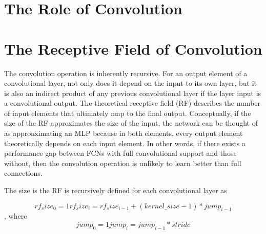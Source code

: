 

\section{The Role of Convolution}

\section{The Receptive Field of Convolution}
The convolution operation is inherently recursive. For an output element of a convolutional layer, not only does it depend on the input to its own layer, but it is also an indirect product of any previous convolutional layer if the layer input is a convolutional output. The theoretical receptive field (RF) describes the number of input elements that ultimately map to the final output. Conceptually, if the size of the RF approximates the size of the input, the network can be thought of as approaximating an MLP because in both elements, every output element theoretically depends on each input element. In other words, if there exists a performance gap between FCNs with full convolutional support and those without, then the convolution operation is unlikely to learn better than full connections.

The size is the RF is recursively defined for each convolutional layer as \cite{luo2016understanding}

$$
rf_size_{0} = 1
rf_size_{i} = rf_size_{i-1} + (kernel\_size - 1) * jump_{i-1}
$$
, where
$$
jump_{0} = 1
jump_{i} = jump_{i-1} * stride
$$

